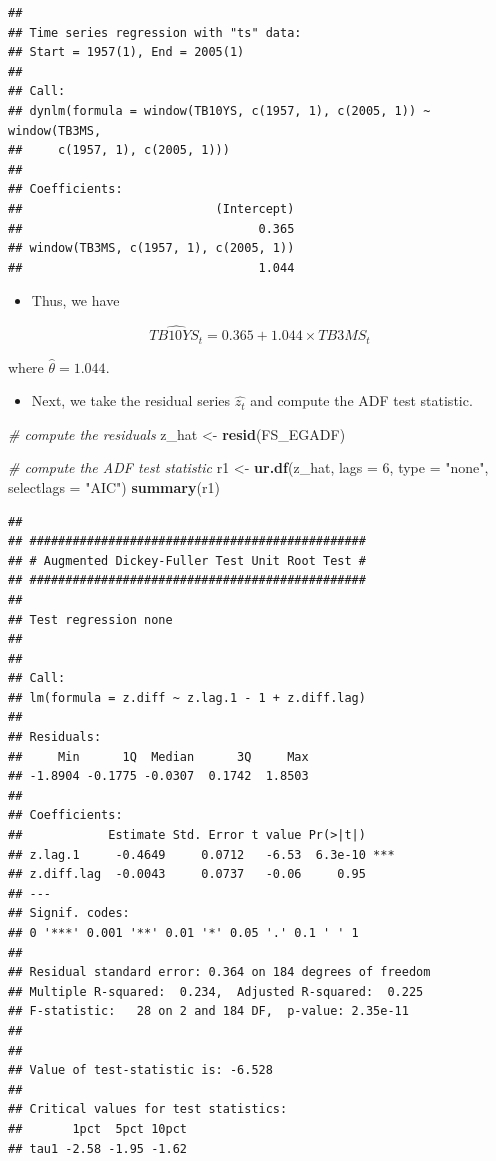 \documentclass[]{book}
\newenvironment{Shaded}{\begin{snugshade}}{\end{snugshade}}
\newcommand{\CommentTok}[1]{\textcolor[rgb]{0.56,0.35,0.01}{\textit{#1}}}
\newcommand{\DataTypeTok}[1]{\textcolor[rgb]{0.13,0.29,0.53}{#1}}
\newcommand{\DecValTok}[1]{\textcolor[rgb]{0.00,0.00,0.81}{#1}}
\newcommand{\KeywordTok}[1]{\textcolor[rgb]{0.13,0.29,0.53}{\textbf{#1}}}
\newcommand{\NormalTok}[1]{#1}
\newcommand{\StringTok}[1]{\textcolor[rgb]{0.31,0.60,0.02}{#1}}
\providecommand{\tightlist}{%
  \setlength{\itemsep}{0pt}\setlength{\parskip}{0pt}}
\begin{document}
\begin{verbatim}
## 
## Time series regression with "ts" data:
## Start = 1957(1), End = 2005(1)
## 
## Call:
## dynlm(formula = window(TB10YS, c(1957, 1), c(2005, 1)) ~ window(TB3MS, 
##     c(1957, 1), c(2005, 1)))
## 
## Coefficients:
##                           (Intercept)  
##                                 0.365  
## window(TB3MS, c(1957, 1), c(2005, 1))  
##                                 1.044
\end{verbatim}

\begin{itemize}
\tightlist
\item
  Thus, we have
\end{itemize}

\[\hat{TB10YS_t} = 0.365  + 1.044 \times TB3MS_t\]

where \(\hat{\theta} = 1.044.\)

\begin{itemize}
\tightlist
\item
  Next, we take the residual series \(\hat{z_t}\) and compute the ADF test statistic.
\end{itemize}

\begin{Shaded}
\begin{Highlighting}[]
\CommentTok{# compute the residuals}
\NormalTok{z_hat <-}\StringTok{ }\KeywordTok{resid}\NormalTok{(FS_EGADF)}

\CommentTok{# compute the ADF test statistic}
\NormalTok{r1 <-}\StringTok{ }\KeywordTok{ur.df}\NormalTok{(z_hat, }\DataTypeTok{lags =} \DecValTok{6}\NormalTok{, }\DataTypeTok{type =} \StringTok{"none"}\NormalTok{, }\DataTypeTok{selectlags =} \StringTok{"AIC"}\NormalTok{)}
\KeywordTok{summary}\NormalTok{(r1)}
\end{Highlighting}
\end{Shaded}

\begin{verbatim}
## 
## ############################################### 
## # Augmented Dickey-Fuller Test Unit Root Test # 
## ############################################### 
## 
## Test regression none 
## 
## 
## Call:
## lm(formula = z.diff ~ z.lag.1 - 1 + z.diff.lag)
## 
## Residuals:
##     Min      1Q  Median      3Q     Max 
## -1.8904 -0.1775 -0.0307  0.1742  1.8503 
## 
## Coefficients:
##            Estimate Std. Error t value Pr(>|t|)    
## z.lag.1     -0.4649     0.0712   -6.53  6.3e-10 ***
## z.diff.lag  -0.0043     0.0737   -0.06     0.95    
## ---
## Signif. codes:  
## 0 '***' 0.001 '**' 0.01 '*' 0.05 '.' 0.1 ' ' 1
## 
## Residual standard error: 0.364 on 184 degrees of freedom
## Multiple R-squared:  0.234,  Adjusted R-squared:  0.225 
## F-statistic:   28 on 2 and 184 DF,  p-value: 2.35e-11
## 
## 
## Value of test-statistic is: -6.528 
## 
## Critical values for test statistics: 
##       1pct  5pct 10pct
## tau1 -2.58 -1.95 -1.62
\end{verbatim}
\end{document}
